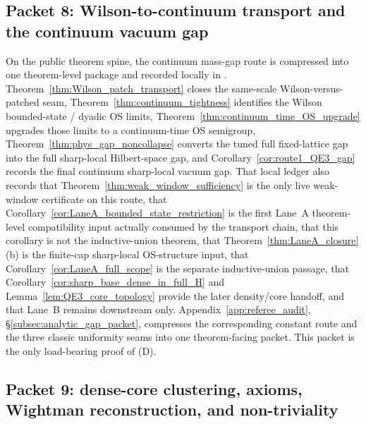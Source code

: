 \subsection{Packet 8: Wilson-to-continuum transport and the continuum vacuum gap}

On the public theorem spine, the continuum mass-gap route is compressed into one theorem-level package and recorded locally in .
Theorem~\ref{thm:Wilson_patch_transport} closes the same-scale Wilson-versus-patched seam, Theorem~\ref{thm:continuum_tightness} identifies the Wilson bounded-state / dyadic OS limits, Theorem~\ref{thm:continuum_time_OS_upgrade} upgrades those limits to a continuum-time OS semigroup, Theorem~\ref{thm:phys_gap_noncollapse} converts the tuned full fixed-lattice gap into the full sharp-local Hilbert-space gap, and Corollary~\ref{cor:route1_QE3_gap} records the final continuum sharp-local vacuum gap.
That local ledger also records that Theorem~\ref{thm:weak_window_sufficiency} is the only live weak-window certificate on this route, that Corollary~\ref{cor:LaneA_bounded_state_restriction} is the first Lane~A theorem-level compatibility input actually consumed by the transport chain, that this corollary is not the inductive-union theorem, that Theorem~\ref{thm:LaneA_closure}(b) is the finite-cap sharp-local OS-structure input, that Corollary~\ref{cor:LaneA_full_scope} is the separate inductive-union passage, that Corollary~\ref{cor:sharp_base_dense_in_full_H} and Lemma~\ref{lem:QE3_core_topology} provide the later density/core handoff, and that Lane~B remains downstream only.
Appendix~\ref{app:referee_audit}, \S\ref{subsec:analytic_gap_packet}, compresses the corresponding constant route and the three classic uniformity seams into one theorem-facing packet.
This packet is the only load-bearing proof of (D).

\subsection{Packet 9: dense-core clustering, axioms, Wightman reconstruction, and non-triviality}

